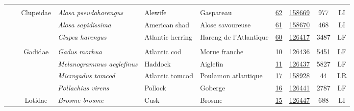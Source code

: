\documentclass[12pt]{article}\usepackage[]{graphicx}\usepackage[]{color}
\begin{document}
\begin{landscapepage}
\begin{longtable}[t]{ccc>{\centering\arraybackslash}p{3cm}>{\centering\arraybackslash}p{3cm}>{\centering\arraybackslash}p{3cm}>{}c>{}ccc}
\addlinespace[0.3em]
\\
\hspace{1em}\hspace{1em} &  & Clupeidae & \em{Alosa pseudoharengus} & Alewife & Gaspareau & \href{#sec:62}{62} & \href{http://www.marinespecies.org/aphia.php?p=taxdetails&id=158669}{158669} & 977 & LI\\
\hspace{1em}\hspace{1em} &  &  & \em{Alosa sapidissima} & American shad & Alose savoureuse & \href{#sec:61}{61} & \href{http://www.marinespecies.org/aphia.php?p=taxdetails&id=158670}{158670} & 468 & LI\\
\hspace{1em}\hspace{1em} &  &  & \em{Clupea harengus} & Atlantic herring & Hareng de l'Atlantique & \href{#sec:60}{60} & \href{http://www.marinespecies.org/aphia.php?p=taxdetails&id=126417}{126417} & 3487 & LF\\
\addlinespace[0.3em]
\\
\hspace{1em}\hspace{1em} &  & Gadidae & \em{Gadus morhua} & Atlantic cod & Morue franche & \href{#sec:10}{10} & \href{http://www.marinespecies.org/aphia.php?p=taxdetails&id=126436}{126436} & 5451 & LF\\
\hspace{1em}\hspace{1em} &  &  & \em{Melanogrammus aeglefinus} & Haddock & Aiglefin & \href{#sec:11}{11} & \href{http://www.marinespecies.org/aphia.php?p=taxdetails&id=126437}{126437} & 5827 & LF\\
\hspace{1em}\hspace{1em} &  &  & \em{Microgadus tomcod} & Atlantic tomcod & Poulamon atlantique & \href{#sec:17}{17} & \href{http://www.marinespecies.org/aphia.php?p=taxdetails&id=158928}{158928} & 44 & LR\\
\hspace{1em}\hspace{1em} &  &  & \em{Pollachius virens} & Pollock & Goberge & \href{#sec:16}{16} & \href{http://www.marinespecies.org/aphia.php?p=taxdetails&id=126441}{126441} & 2787 & LF\\
\hspace{1em}\hspace{1em} &  & Lotidae & \em{Brosme brosme} & Cusk & Brosme & \href{#sec:15}{15} & \href{http://www.marinespecies.org/aphia.php?p=taxdetails&id=126447}{126447} & 688 & LI\\

\end{longtable}
\end{landscapepage}
\end{document}
